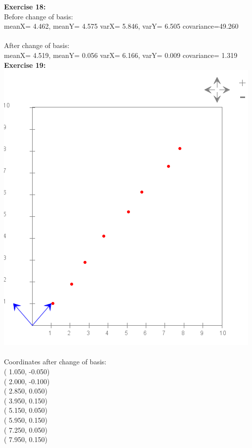 \documentclass[10pt]{article}
\begin{document}
	\textbf{\large Exercise 18:}\\
	Before change of basis:\\
	meanX= 4.462, meanY= 4.575 varX= 5.846, varY= 6.505 covariance=49.260
	\\\\
	After change of basis:\\
	meanX= 4.519, meanY= 0.056 varX= 6.166, varY= 0.009 covariance= 1.319
	\\
	
	\textbf{\large Exercise 19:}\\
	\includegraphics[scale=.5]{module7_exercise19}
	\\\\
	Coordinates after change of basis:\\
	( 1.050, -0.050)\\
	( 2.000, -0.100)\\
	( 2.850,  0.050)\\
	( 3.950,  0.150)\\
	( 5.150,  0.050)\\
	( 5.950,  0.150)\\
	( 7.250,  0.050)\\
	( 7.950,  0.150)
	\\
	
\end{document}
